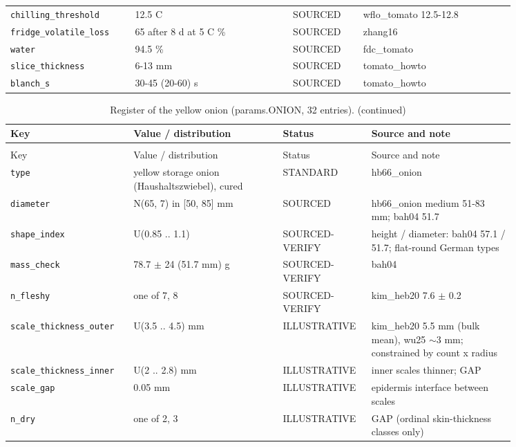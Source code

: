 \documentclass[10.5pt,a4paper]{article}
\begin{document}
{\begin{longtable}{@{}p{0.2\linewidth}p{0.27\linewidth}p{0.12\linewidth}p{0.26\linewidth}@{}}
\texttt{chilling\_\allowbreak{}threshold} & 12.5 C & SOURCED & wflo\_tomato 12.5-12.8 \\
\texttt{fridge\_\allowbreak{}volatile\_\allowbreak{}loss} & 65 after 8 d at 5 C \% & SOURCED & zhang16 \\
\texttt{water} & 94.5 \% & SOURCED & fdc\_tomato \\
\texttt{slice\_\allowbreak{}thickness} & 6-13 mm & SOURCED & tomato\_howto \\
\texttt{blanch\_\allowbreak{}s} & 30-45 (20-60) s & SOURCED & tomato\_howto \\\bottomrule\end{longtable}}
{\scriptsize\begin{longtable}{@{}p{0.2\linewidth}p{0.27\linewidth}p{0.12\linewidth}p{0.26\linewidth}@{}}\caption{Register of the yellow onion (params.ONION, 32 entries).}\\\toprule Key & Value / distribution & Status & Source and note \\\midrule\endfirsthead
\caption[]{Register of the yellow onion (params.ONION, 32 entries). (continued)}\\\toprule Key & Value / distribution & Status & Source and note \\\midrule\endhead
\texttt{type} & yellow storage onion (Haushaltszwiebel), cured & STANDARD & hb66\_onion \\
\texttt{diameter} & N(65, 7) in [50, 85] mm & SOURCED & hb66\_onion medium 51-83 mm; bah04 51.7 \\
\texttt{shape\_\allowbreak{}index} & U(0.85 .. 1.1) & SOURCED-VERIFY & height / diameter: bah04 57.1 / 51.7; flat-round German types \\
\texttt{mass\_\allowbreak{}check} & 78.7 $\pm$ 24 (51.7 mm) g & SOURCED-VERIFY & bah04 \\
\texttt{n\_\allowbreak{}fleshy} & one of 7, 8 & SOURCED-VERIFY & kim\_heb20 7.6 $\pm$ 0.2 \\
\texttt{scale\_\allowbreak{}thickness\_\allowbreak{}outer} & U(3.5 .. 4.5) mm & ILLUSTRATIVE & kim\_heb20 5.5 mm (bulk mean), wu25 $\sim$3 mm; constrained by count x radius \\
\texttt{scale\_\allowbreak{}thickness\_\allowbreak{}inner} & U(2 .. 2.8) mm & ILLUSTRATIVE & inner scales thinner; GAP \\
\texttt{scale\_\allowbreak{}gap} & 0.05 mm & ILLUSTRATIVE & epidermis interface between scales \\
\texttt{n\_\allowbreak{}dry} & one of 2, 3 & ILLUSTRATIVE & GAP (ordinal skin-thickness classes only) \\

\end{longtable}}
\end{document}
